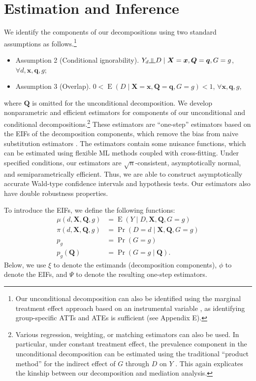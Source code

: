 \documentclass[12pt,a4paper]{article}
\newcommand{\indep}{\rotatebox[origin=c]{90}{$\models$}}  %
\newcommand{\E}{\operatorname{E}}
\def\X{{\boldsymbol X}}
\def\x{{\boldsymbol x}}
\def\Q{{\boldsymbol Q}}
\def\q{{\boldsymbol q}}
\DeclareMathOperator{\Pro}{Pr}
\begin{document}
\section{Estimation and Inference}
We identify the components of our decompositions using two standard assumptions as follows.\footnote{Our unconditional decomposition can also be identified using the marginal treatment effect approach based on an instrumental variable \citep{heckman_structural_2005, zhou_heterogeneous_2020}, as identifying group-specific ATTs and ATEs is sufficient (see Appendix E).}
\begin{itemize}
    \item[] Assumption 2 (Conditional ignorability). $Y_d \indep D \mid \X=\x, \Q=\q, G=g$, $\forall d, \x, \q, g$;
    \item[] Assumption 3 (Overlap). $0 < \E(D \mid \X=\x, \Q=\q, G=g) <1$, $\forall \x, \q, g$,
\end{itemize}
where $\Q$ is omitted for the unconditional decomposition. 
We develop nonparametric and efficient estimators for components of our unconditional and conditional decompositions.\footnote{Various regression, weighting, or matching estimators can also be used. In particular, under constant treatment effect, the prevalence component in the unconditional decomposition can be estimated using the traditional ``product method'' for the indirect effect of $G$ through $D$ on $Y$ \citep{baron_moderator-mediator_1986}. This again explicates the kinship between our decomposition and mediation analysis. }
These estimators are ``one-step'' estimators based on the EIFs of the decomposition components, which remove the bias from naive substitution estimators \citep{bickel_efficient_1998, van_der_vaart_asymptotic_2000,hines_demystifying_2022}. The estimators contain some nuisance functions, which can be estimated using flexible ML methods coupled with cross-fitting. Under specified conditions, our estimators are $\sqrt{n}$-consistent, asymptotically normal, and semiparametrically efficient. Thus, we are able to construct asymptotically accurate Wald-type confidence intervals and hypothesis tests. Our estimators also have double robustness properties.  

To introduce the EIFs, we define the following functions:
\begin{align*}
    \mu(d,\X,\Q, g)&=\E(Y \mid D, \X, \Q, G=g) \\
    \pi(d,\X, \Q, g) &= \Pro(D=d \mid \X, \Q, G=g) \\
    p_g &= \Pro(G=g) \\
    p_g(\Q) &= \Pro(G=g \mid \Q).
\end{align*}
Below, we use $\xi$ to denote the estimands (decomposition components), $\phi$ to denote the EIFs, and $\Psi$ to denote the resulting one-step estimators. 
\end{document}
